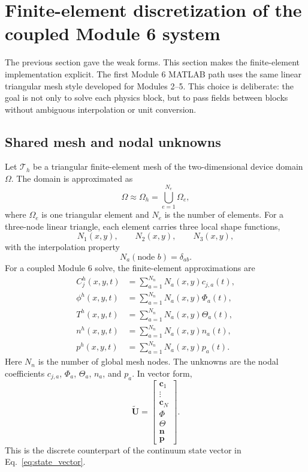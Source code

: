 \documentclass[11pt]{article}
\newcommand{\Uvec}{\bm{U}}
\newcommand{\OmegaD}{\Omega}
\begin{document}
\section{Finite-element discretization of the coupled Module 6 system}

The previous section gave the weak forms. This section makes the finite-element implementation explicit. The first Module 6 MATLAB path uses the same linear triangular mesh style developed for Modules 2--5. This choice is deliberate: the goal is not only to solve each physics block, but to pass fields between blocks without ambiguous interpolation or unit conversion.

\subsection{Shared mesh and nodal unknowns}

Let \(\mathcal{T}_h\) be a triangular finite-element mesh of the two-dimensional device domain \(\OmegaD\). The domain is approximated as
\begin{equation}
\OmegaD \approx \Omega_h = \bigcup_{e=1}^{N_e} \Omega_e,
\end{equation}
where \(\Omega_e\) is one triangular element and \(N_e\) is the number of elements. For a three-node linear triangle, each element carries three local shape functions,
\begin{equation}
N_1(x,y), \qquad N_2(x,y), \qquad N_3(x,y),
\end{equation}
with the interpolation property
\begin{equation}
N_a(\text{node } b)=\delta_{ab}.
\end{equation}
For a coupled Module 6 solve, the finite-element approximations are
\begin{align}
C_j^h(x,y,t) &= \sum_{a=1}^{N_n} N_a(x,y)c_{j,a}(t), \\
\phi^h(x,y,t) &= \sum_{a=1}^{N_n} N_a(x,y)\Phi_a(t), \\
T^h(x,y,t) &= \sum_{a=1}^{N_n} N_a(x,y)\Theta_a(t), \\
n^h(x,y,t) &= \sum_{a=1}^{N_n} N_a(x,y)n_a(t), \\
p^h(x,y,t) &= \sum_{a=1}^{N_n} N_a(x,y)p_a(t).
\end{align}
Here \(N_n\) is the number of global mesh nodes. The unknowns are the nodal coefficients \(c_{j,a}\), \(\Phi_a\), \(\Theta_a\), \(n_a\), and \(p_a\). In vector form,
\begin{equation}
\boxed{
\widetilde{\Uvec}
=
\begin{bmatrix}
\mathbf{c}_1 \\
\vdots \\
\mathbf{c}_N \\
\Phi \\
\Theta \\
\mathbf{n} \\
\mathbf{p}
\end{bmatrix}.}
\label{eq:module6_discrete_state}
\end{equation}
This is the discrete counterpart of the continuum state vector in Eq.~\eqref{eq:state_vector}.
\end{document}

